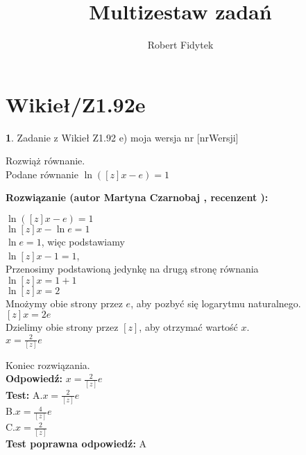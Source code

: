 \documentclass[12pt, a4paper]{article}
\title{Multizestaw zadań}
\author{Robert Fidytek}
\date{}
\theoremstyle{definition} %
\newtheorem{zad}{}
\newcommand{\kategoria}[1]{\section{#1}} %
\newcommand{\zadStart}[1]{\begin{zad}#1\newline} %
\newcommand{\zadStop}{\end{zad}}   %
\newcommand{\rozwStart}[2]{\noindent \textbf{Rozwiązanie (autor #1 , recenzent #2): }\newline} %
\newcommand{\rozwStop}{\newline}                                            %
\newcommand{\odpStart}{\noindent \textbf{Odpowiedź:}\newline}    %
\newcommand{\odpStop}{\newline}                                             %
\newcommand{\testStart}{\noindent \textbf{Test:}\newline} %
\newcommand{\testStop}{\newline} %
\newcommand{\kluczStart}{\noindent \textbf{Test poprawna odpowiedź:}\newline} %
\newcommand{\kluczStop}{\newline} %
\begin{document}
\maketitle


\kategoria{Wikieł/Z1.92e}
\zadStart{Zadanie z Wikieł Z1.92 e) moja wersja nr [nrWersji]}

Rozwiąż równanie.\\
Podane równanie $ \ln([z]x-e)=1 $\\
\zadStop
\rozwStart{Martyna Czarnobaj}{}
\begin{center}
	 $ \ln([z]x-e)=1 $\\
	 $ \ln[z]x - \ln e = 1 $\\
	 $ \ln e = 1 $, więc podstawiamy\\
	 $ \ln[z]x - 1 = 1 $,\\
	 Przenosimy podstawioną jedynkę na drugą stronę równania\\
	 $ \ln[z]x = 1 + 1 $\\
	 $ \ln[z]x = 2 $\\
	 Mnożymy obie strony przez $ e $, aby pozbyć się logarytmu naturalnego.\\
	 $ [z]x = 2e $\\
	 Dzielimy obie strony przez $ [z] $, aby otrzymać wartość $ x $.\\
	 $ x = \frac{2}{[z]}e $\\
	 
\end{center}
Koniec rozwiązania.\\
\rozwStop
\odpStart
$ x = \frac{2}{[z]}e $\\
\odpStop
\testStart
A.$ x = \frac{2}{[z]}e $\\
B.$ x = \frac{4}{[z]}e $\\
C.$ x = \frac{2}{[z]} $\\
\testStop
\kluczStart
A
\kluczStop
\end{document}

